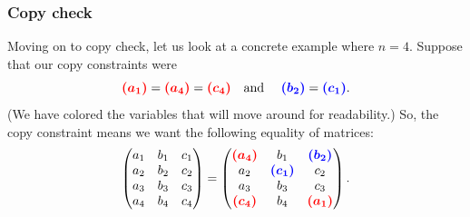 \subsubsection{Copy check}

Moving on to copy check, let us look at a concrete example where
\(n = 4\). Suppose that our copy constraints were
\[ \textcolor{red}{\boldsymbol{(a_{1})}} = 
\textcolor{red}{\boldsymbol{(a_{4})}} = 
\textcolor{red}{\boldsymbol{(c_{4})}}
\quad\text{and }\quad \textcolor{blue}{\boldsymbol{(b_{2})}} = \textcolor{blue}{\boldsymbol{(c_{1})}}.\]
(We have colored the variables that will move around for
readability.) So, the copy constraint means we want the following
equality of matrices: 
\begin{equation}
\label{copy1}
\begin{pmatrix}
a_{1} & b_{1} & c_{1} \\
a_{2} & b_{2} & c_{2} \\
a_{3} & b_{3} & c_{3} \\
a_{4} & b_{4} & c_{4}
\end{pmatrix} = \begin{pmatrix}
\textcolor{red}{\boldsymbol{(a_{4})}} & b_{1} & \textcolor{blue}{\boldsymbol{(b_{2})}} \\
a_{2} & \textcolor{blue}{\boldsymbol{(c_{1})}} & c_{2} \\
a_{3} & b_{3} & c_{3} \\
\textcolor{red}{\boldsymbol{(c_{4})}} & b_{4} & \textcolor{red}{\boldsymbol{(a_{1})}}
\end{pmatrix}.
\end{equation}

